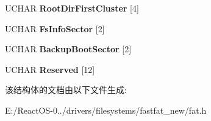 \begin{DoxyCompactItemize}
U\+C\+H\+AR {\bfseries Root\+Dir\+First\+Cluster} \mbox{[}4\mbox{]}
\item 
\mbox{\label{struct___p_a_c_k_e_d___b_i_o_s___p_a_r_a_m_e_t_e_r___b_l_o_c_k___e_x_ab12bc06c82a49f638d6af22c94cb9a2e}} 
U\+C\+H\+AR {\bfseries Fs\+Info\+Sector} \mbox{[}2\mbox{]}
\item 
\mbox{\label{struct___p_a_c_k_e_d___b_i_o_s___p_a_r_a_m_e_t_e_r___b_l_o_c_k___e_x_a6affcf9e4eb174c7dc4142028d96b379}} 
U\+C\+H\+AR {\bfseries Backup\+Boot\+Sector} \mbox{[}2\mbox{]}
\item 
\mbox{\label{struct___p_a_c_k_e_d___b_i_o_s___p_a_r_a_m_e_t_e_r___b_l_o_c_k___e_x_a73ff694021e24e505eeff65c005b697d}} 
U\+C\+H\+AR {\bfseries Reserved} \mbox{[}12\mbox{]}
\end{DoxyCompactItemize}


该结构体的文档由以下文件生成\+:\begin{DoxyCompactItemize}
\item 
E\+:/\+React\+O\+S-\/0../drivers/filesystems/fastfat\+\_\+new/fat.\+h\end{DoxyCompactItemize}
